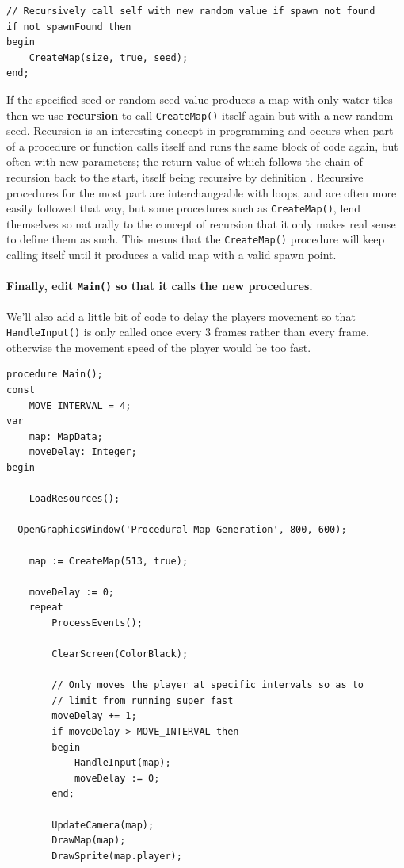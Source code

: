 \documentclass{article}
\begin{document}
\begin{verbatim}
// Recursively call self with new random value if spawn not found
if not spawnFound then
begin
	CreateMap(size, true, seed);
end;
\end{verbatim}

If the specified seed or random seed value produces a map with only water tiles then we use \textbf{recursion} to call \texttt{CreateMap()} itself again but with a new random seed. Recursion is an interesting concept in programming and occurs when part of a procedure or function calls itself and runs the same block of code again, but often with new parameters; the return value of which follows the chain of recursion back to the start, itself being recursive by definition \parencite{recursion}. Recursive procedures for the most part are interchangeable with loops, and are often more easily followed that way, but some procedures such as \texttt{CreateMap()}, lend themselves so naturally to the concept of recursion that it only makes real sense to define them as such. This means that the \texttt{CreateMap()} procedure will keep calling itself until it produces a valid map with a valid spawn point.

\paragraph{Finally, edit \texttt{Main()} so that it calls the new procedures.} We'll also add a little bit of code to delay the players movement so that \texttt{HandleInput()} is only called once every 3 frames rather than every frame, otherwise the movement speed of the player would be too fast.

\begin{verbatim}
procedure Main();
const
	MOVE_INTERVAL = 4;
var
	map: MapData;
	moveDelay: Integer;
begin

	LoadResources();
  
  OpenGraphicsWindow('Procedural Map Generation', 800, 600);
  
	map := CreateMap(513, true);

	moveDelay := 0;
	repeat
		ProcessEvents();

		ClearScreen(ColorBlack);
		
		// Only moves the player at specific intervals so as to
		// limit from running super fast
		moveDelay += 1;
		if moveDelay > MOVE_INTERVAL then
		begin
			HandleInput(map);
			moveDelay := 0;
		end;

		UpdateCamera(map);
		DrawMap(map);
		DrawSprite(map.player);
\end{verbatim}
\end{document}

